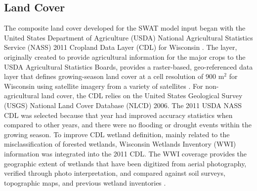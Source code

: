 \subsection{Land Cover}\label{sec:land_cover}
The composite land cover developed for the SWAT model input began with the United States Department of Agriculture (USDA) National Agricultural Statistics Service (NASS) 2011 Cropland Data Layer (CDL) for Wisconsin . The layer, originally created to provide agricultural information for the major crops to the USDA Agricultural Statistics Boards, provides a raster-based, geo-referenced data layer that defines growing-season land cover at a cell resolution of 900 m$^2$ for Wisconsin using satellite imagery from a variety of satellites . For non-agricultural land cover, the CDL relies on the United States Geological Survey (USGS) National Land Cover Database (NLCD) 2006. The 2011 USDA NASS CDL was selected because that year had improved accuracy statistics when compared to other years, and there were no flooding or drought events within the growing season. To improve CDL wetland definition, mainly related to the misclassification of forested wetlands, Wisconsin Wetlands Inventory (WWI) information was integrated into the 2011 CDL. The WWI coverage provides the geographic extent of wetlands that have been digitized from aerial photography, verified through photo interpretation, and compared against soil surveys, topographic maps, and previous wetland inventories .

